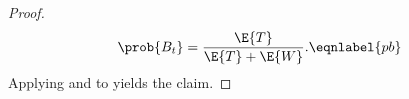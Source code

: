 \documentclass[conference, 10pt]{IEEEtran}
\newcommand{\dpage}{\hat{y}}
\newcommand{\monage}{\hat{z}}
\begin{document}
\begin{proof}
    \begin{equation}
        \prob{B_t} = \frac{\E{T}}{\E{T} + \E{W}}. \eqnlabel{pb}
    \end{equation}
    Applying  and  to  yields the claim.
\end{proof}
\end{document}
